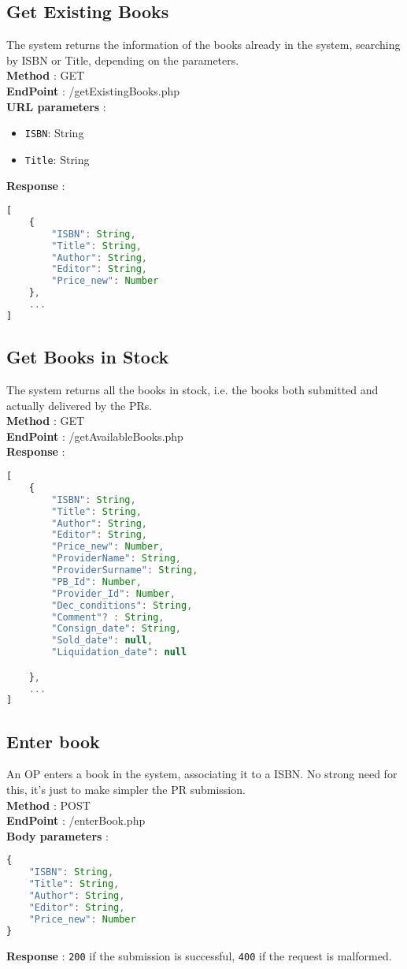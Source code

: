 \subsection{Get Existing Books}
The system returns the information of the books already in the system, searching by ISBN or Title, depending on the parameters.\\
\textbf{Method} : GET \\
\textbf{EndPoint} : /getExistingBooks.php \\
\textbf{URL parameters} :
\begin{itemize}
    \item \texttt{ISBN}: String
    \item \texttt{Title}: String
\end{itemize}
\textbf{Response} :
\begin{lstlisting}[language=JavaScript, label={lst:jscode}, basicstyle=\ttfamily]
[
    {
        "ISBN": String,
        "Title": String,
        "Author": String,
        "Editor": String,
        "Price_new": Number
    },
    ...
]
\end{lstlisting}

\subsection{Get Books in Stock}
The system returns all the books in stock, i.e. the books both submitted and actually delivered by the PRs.\\
\textbf{Method} : GET \\
\textbf{EndPoint} : /getAvailableBooks.php \\
\textbf{Response} :
\begin{lstlisting}[language=JavaScript, label={lst:jscode}, basicstyle=\ttfamily]
[
    {
        "ISBN": String,
        "Title": String,
        "Author": String,
        "Editor": String,
        "Price_new": Number,
        "ProviderName": String,
        "ProviderSurname": String,
        "PB_Id": Number,
        "Provider_Id": Number,
        "Dec_conditions": String,
        "Comment"? : String,
        "Consign_date": String,
        "Sold_date": null, 
        "Liquidation_date": null

    },
    ...
]
\end{lstlisting}

\subsection{Enter book}
An OP enters a book in the system, associating it to a ISBN. No strong need for this, it's just to make simpler the PR submission.\\
\textbf{Method} : POST \\
\textbf{EndPoint} : /enterBook.php \\
\textbf{Body parameters} :
\begin{lstlisting}[language=JavaScript, label={lst:jscode}, basicstyle=\ttfamily]
{
    "ISBN": String,
    "Title": String,
    "Author": String,
    "Editor": String,
    "Price_new": Number
}
\end{lstlisting}
\textbf{Response} : \texttt{200} if the submission is successful, \texttt{400} if the request is malformed.

